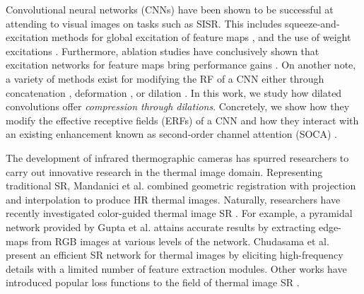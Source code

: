 \documentclass[runningheads]{llncs}
\begin{document}

Convolutional neural networks (CNNs) have been shown to be successful at
attending to visual images on tasks such as SISR. This includes
squeeze-and-excitation methods for global excitation of feature maps
\cite{hu2018squeeze,li2019compressing}, and the use of weight excitations
\cite{quader2020weight,lin2020context}. Furthermore, ablation studies have
conclusively shown that excitation networks for feature maps bring performance
gains \cite{zhang2018image}. On another note, a variety of methods exist for
modifying the RF of a CNN either through concatenation \cite{li2018multi},
deformation \cite{dai2017deformable}, or dilation \cite{szegedy2015going}. In
this work, we study how dilated convolutions offer \emph{compression through
dilations}. Concretely, we show how they modify the effective receptive fields
(ERFs) of a CNN and how they interact with an existing enhancement known as
second-order channel attention (SOCA) \cite{dai2019second}.
 
The development of infrared thermographic cameras has spurred researchers to
carry out innovative research in the thermal image domain. Representing
traditional SR, Mandanici et al. \cite{mandanici2019multi} combined geometric
registration with projection and interpolation to produce HR thermal images.
Naturally, researchers have recently investigated color-guided thermal image SR
\cite{chen2016color,almasri2018rgb}. For example, a pyramidal network provided
by Gupta et al. \cite{gupta2020pyramidal} attains accurate results by extracting
edge-maps from RGB images at various levels of the network.  Chudasama et al.
\cite{chudasama2020therisurnet} present an efficient SR network for thermal
images by eliciting high-frequency details with a limited number of feature
extraction modules. Other works have introduced popular loss functions to the
field of thermal image SR \cite{almasri2018multimodal,kansal2020multi}.  
\end{document}

